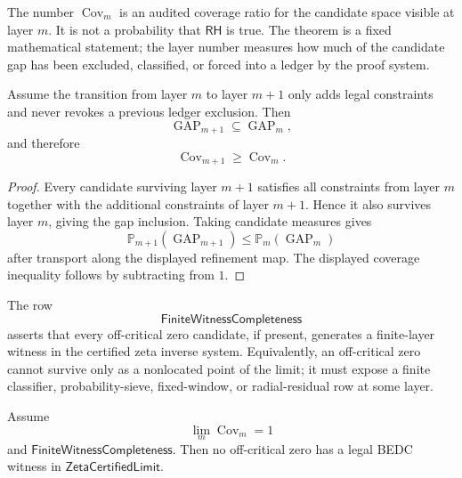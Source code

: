 \begin{principle}
\label{prin:rh-coverage-not-theorem-probability}
The number $\operatorname{Cov}_m$ is an audited coverage ratio for the
candidate space visible at layer $m$.  It is not a probability that
$\mathsf{RH}$ is true.  The theorem is a fixed mathematical statement;
the layer number measures how much of the candidate gap has been
excluded, classified, or forced into a ledger by the proof system.
\end{principle}

\begin{theorem}
\label{thm:rh-coverage-monotone-append-only}
Assume the transition from layer $m$ to layer $m+1$ only adds legal
constraints and never revokes a previous ledger exclusion.  Then
$$
\operatorname{GAP}_{m+1}\subseteq\operatorname{GAP}_m,
$$
and therefore
$$
\operatorname{Cov}_{m+1}\ge\operatorname{Cov}_m.
$$
\end{theorem}

\begin{proof}
Every candidate surviving layer $m+1$ satisfies all constraints from
layer $m$ together with the additional constraints of layer $m+1$.
Hence it also survives layer $m$, giving the gap inclusion.  Taking
candidate measures gives
$$
\mathbb P_{m+1}(\operatorname{GAP}_{m+1})
\le
\mathbb P_m(\operatorname{GAP}_m)
$$
after transport along the displayed refinement map.  The displayed
coverage inequality follows by subtracting from $1$.
\end{proof}

\begin{definition}[FiniteWitnessCompleteness]
\label{def:rh-finite-witness-completeness}
The row
$$
\mathsf{FiniteWitnessCompleteness}
$$
asserts that every off-critical zero candidate, if present, generates a
finite-layer witness in the certified zeta inverse system.  Equivalently,
an off-critical zero cannot survive only as a nonlocated point of the
limit; it must expose a finite classifier, probability-sieve,
fixed-window, or radial-residual row at some layer.
\end{definition}

\begin{theorem}
\label{thm:rh-coverage-limit-excludes-certified-offcritical-witnesses}
Assume
$$
\lim_m\operatorname{Cov}_m=1
$$
and $\mathsf{FiniteWitnessCompleteness}$.  Then no off-critical zero has
a legal BEDC witness in $\mathsf{ZetaCertifiedLimit}$.
\end{theorem}

